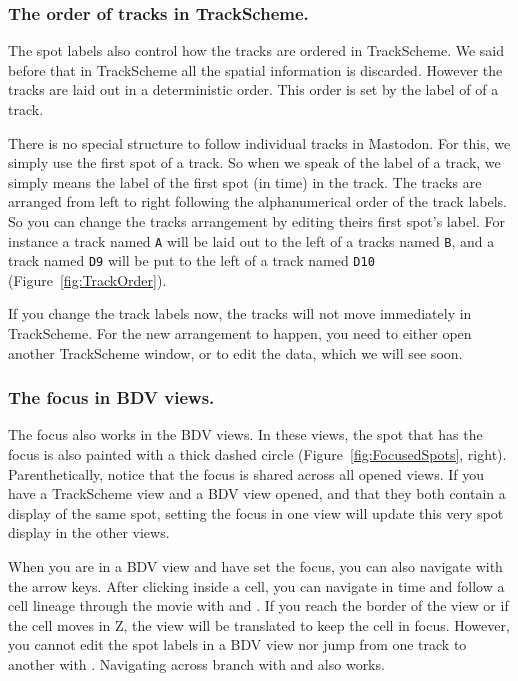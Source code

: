 \subsubsection{The order of tracks in TrackScheme.}

The spot labels also control how the tracks are ordered in TrackScheme.
We said before that in TrackScheme all the spatial information is discarded. 
However the tracks are laid out in a deterministic order.
This order is set by the label of of a track. 

There is no special structure to follow individual tracks in Mastodon. 
For this, we simply use the first spot of a track. 
So when we speak of the label of a track, we simply means the label of the first spot (in time) in the track. 
The tracks are arranged from left to right following the alphanumerical order of the track labels.
So you can change the tracks arrangement by editing theirs first spot's label.
For instance a track named \texttt{A} will be laid out to the left of a tracks named \texttt{B}, and a track named \texttt{D9} will be put to the left of a track named \texttt{D10} (Figure~\ref{fig:TrackOrder}).

If you change the track labels now, the tracks will not move immediately in TrackScheme.
For the new arrangement to happen, you need to either open another TrackScheme window, or to edit the data, which we will see soon.


\subsubsection{The focus in BDV views.}

The focus also works in the BDV views.
In these views, the spot that has the focus is also painted with a thick dashed circle (Figure~\ref{fig:FocusedSpots}, right).
Parenthetically, notice that the focus is shared across all opened views. 
If you have a TrackScheme view and a BDV view opened, and that they both contain a display of the same spot, setting the focus in one view will update this very spot display in the other views.

When you are in a BDV view and have set the focus, you can also navigate with the arrow keys.
After clicking inside a cell, you can navigate in time and follow a cell lineage through the movie with \keys{\arrowkeyup} and \keys{\arrowkeydown}.
If you reach the border of the view or if the cell moves in Z, the view will be translated to keep the cell in focus.
However, you cannot edit the spot labels in a BDV view nor jump from one track to another with \keys{\arrowkeyleft} \keys{\arrowkeyright}.
Navigating across branch with \keys{\Alt+\arrowkeyup} and \keys{\Alt+\arrowkeydown} \etc also works.


